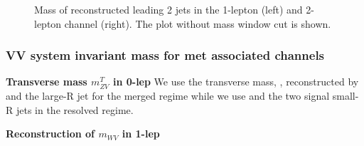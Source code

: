 \begin{figure}[ht]
    \centering
    \caption{ Mass of reconstructed leading 2 jets in the 1-lepton (left) and 2-lepton channel (right). The plot without mass window cut is shown.} 
    \label{fig:1lep2lepMVHadResSR}
\end{figure}





\subsubsection{VV system invariant mass for met associated channels}
\label{subsubsec:mVV_reconstruction}


\textbf{Transverse mass $m^T_{ZV}$ in 0-lep}
We use the transverse mass, \mt, reconstructed by \met and the large-R jet for the merged regime while we use \met and the two signal small-R jets in the resolved regime.

\textbf{Reconstruction of $m_{WV}$ in 1-lep} 

